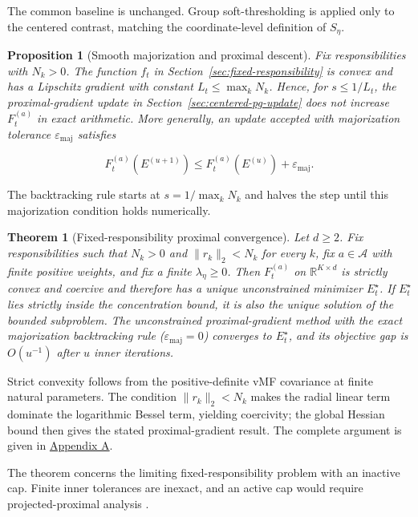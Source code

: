 \documentclass[preprint,12pt,authoryear]{elsarticle}
\newtheorem{proposition}{Proposition}
\newtheorem{theorem}{Theorem}
\begin{document}
The common baseline is unchanged. Group soft-thresholding is applied only
to the centered contrast, matching the coordinate-level definition of
$S_{\eta}$.

\begin{proposition}[Smooth majorization and proximal descent]
\label{prop:majorization}
Fix responsibilities with $N_k>0$. The function
$f_t$ in Section~\ref{sec:fixed-responsibility} is convex and has a Lipschitz
gradient with constant $L_t\leq\max_kN_k$. Hence, for $s\leq1/L_t$, the
proximal-gradient update in Section~\ref{sec:centered-pg-update} does not
increase $F_t^{(a)}$ in exact arithmetic. More generally, an update accepted with
majorization tolerance $\varepsilon_{\mathrm{maj}}$ satisfies

\[
F_t^{(a)}(E^{(u+1)})
\leq F_t^{(a)}(E^{(u)})+\varepsilon_{\mathrm{maj}}.
\]
\end{proposition}

The backtracking rule starts at $s=1/\max_kN_k$ and halves the step until this
majorization condition holds numerically.

\begin{theorem}[Fixed-responsibility proximal convergence]
\label{thm:fixed-responsibility}
Let $d\geq2$. Fix responsibilities such that $N_k>0$ and
$\lVert r_k\rVert_2<N_k$ for every $k$, fix $a\in\mathcal A$ with finite
positive weights, and fix a finite $\lambda_\eta\geq0$. Then
$F_t^{(a)}$ on $\mathbb R^{K\times d}$ is strictly convex and coercive and therefore
has a unique unconstrained minimizer $E_t^\star$. If $E_t^\star$ lies strictly
inside the concentration bound, it is also the unique solution of the bounded
subproblem. The unconstrained proximal-gradient method with the exact
majorization backtracking rule ($\varepsilon_{\mathrm{maj}}=0$) converges to
$E_t^\star$,
and its objective gap
is $O(u^{-1})$ after $u$ inner iterations.
\end{theorem}

Strict convexity follows from the positive-definite vMF covariance at finite
natural parameters. The condition $\lVert r_k\rVert_2<N_k$ makes the radial
linear term dominate the logarithmic Bessel term, yielding coercivity; the
global Hessian bound then gives the stated proximal-gradient result. The
complete argument is given in \hyperref[app:proofs]{Appendix A}.

The theorem concerns the limiting fixed-responsibility problem with an
inactive cap. Finite inner tolerances are inexact, and an active cap would
require projected-proximal analysis \citep{beck2009fista,parikh2014proximal}.
\end{document}
